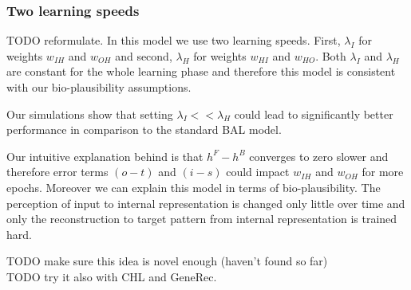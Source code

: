
\subsubsection{Two learning speeds} 
TODO reformulate. 
In this model we use two learning speeds. First, $\lambda_I$ for weights $w_{IH}$ and $w_{OH}$ and second, $\lambda_H$ for weights $w_{HI}$ and $w_{HO}$. Both $\lambda_I$ and $\lambda_H$ are constant for the whole learning phase and therefore this model is consistent with our bio-plausibility assumptions. 

Our simulations show that setting $\lambda_I << \lambda_H$ could lead to significantly better performance in comparison to the standard BAL model. 

Our intuitive explanation behind is that $h^F - h^B$ converges to zero slower and therefore error terms $(o - t)$ and $(i - s)$ could impact $w_{IH}$ and $w_{OH}$ for more epochs. Moreover we can explain this model in terms of bio-plausibility. The perception of input to internal representation is changed only little over time and only the reconstruction to target pattern from internal representation is trained hard. 

TODO make sure this idea is novel enough (haven't found so far) \\
TODO try it also with CHL and GeneRec.  \\ 

